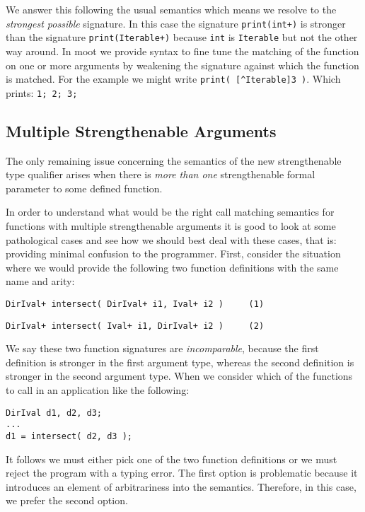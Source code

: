 \documentclass{sigplanconf}
\begin{document}
We answer this following the usual semantics which means we resolve to
the \emph{strongest possible} signature. In this case the signature
\verb-print(int+)- is stronger than the signature
\verb-print(Iterable+)- because \verb-int- is \verb-Iterable- but not
the other way around. In {\sc moot} we provide syntax to fine tune the
matching of the function on one or more arguments by weakening the
signature against which the function is matched. For the example we
might write \verb+print( [^Iterable]3 )+. Which prints: \verb+1; 2; 3;+

\subsection{Multiple Strengthenable Arguments}

The only remaining issue concerning the semantics of the new
strengthenable type qualifier arises when there is \emph{more than
  one} strengthenable formal parameter to some defined function.

In order to understand what would be the right call matching semantics
for functions with multiple strengthenable arguments it is good to look at
some pathological cases and see how we should best deal with these
cases, that is: providing minimal confusion to the programmer. First,
consider the situation where we would provide the following two
function definitions with the same name and arity:
\begin{samepage}
\begin{verbatim}
DirIval+ intersect( DirIval+ i1, Ival+ i2 )     (1)
\end{verbatim}
\end{samepage}
\begin{samepage}
\begin{verbatim}
DirIval+ intersect( Ival+ i1, DirIval+ i2 )     (2)
\end{verbatim}
\end{samepage}
We say these two function signatures are \emph{incomparable}, because
the first definition is stronger in the first argument type, whereas
the second definition is stronger in the second argument type. When we
consider which of the functions to call in an application like the
following:
\begin{samepage}
\begin{verbatim}
DirIval d1, d2, d3;
...
d1 = intersect( d2, d3 );
\end{verbatim}
\end{samepage}
It follows we must either pick one of the two function definitions or
we must reject the program with a typing error. The first option is
problematic because it introduces an element of arbitrariness into the
semantics. Therefore, in this case, we prefer the second option.
\end{document}
